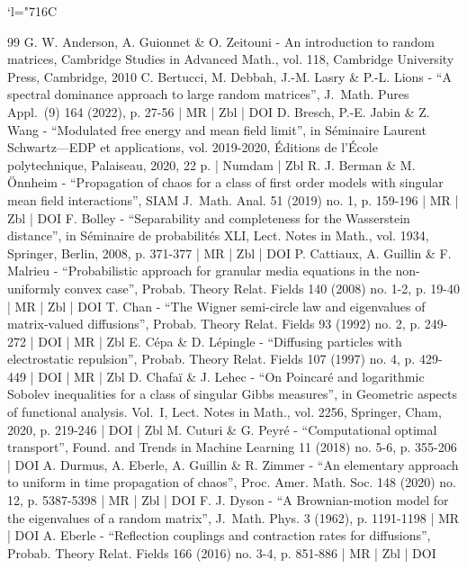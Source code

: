 \documentclass[10pt]{amsart}
\newcommand{\Changelback}{\mathcode`l="716C}
\theoremstyle{plain}
\theoremstyle{definition}
\begin{document}
\Changelback



\begin{thebibliography}{99}
G. W. Anderson, A. Guionnet \& O. Zeitouni - An introduction to random matrices, Cambridge Studies in Advanced Math., vol. 118, Cambridge University Press, Cambridge, 2010
C. Bertucci, M. Debbah, J.-M. Lasry \& P.-L. Lions - “A spectral dominance approach to large random matrices”, J. Math. Pures Appl. (9) 164 (2022), p. 27-56 | MR | Zbl | DOI
D. Bresch, P.-E. Jabin \& Z. Wang - “Modulated free energy and mean field limit”, in Séminaire Laurent Schwartz—EDP et applications, vol. 2019-2020, Éditions de l’École polytechnique, Palaiseau, 2020, 22 p. | Numdam | Zbl
R. J. Berman \& M. Önnheim - “Propagation of chaos for a class of first order models with singular mean field interactions”, SIAM J. Math. Anal. 51 (2019) no. 1, p. 159-196 | MR | Zbl | DOI
F. Bolley - “Separability and completeness for the Wasserstein distance”, in Séminaire de probabilités XLI, Lect. Notes in Math., vol. 1934, Springer, Berlin, 2008, p. 371-377 | MR | Zbl | DOI
P. Cattiaux, A. Guillin \& F. Malrieu - “Probabilistic approach for granular media equations in the non-uniformly convex case”, Probab. Theory Relat. Fields 140 (2008) no. 1-2, p. 19-40 | MR | Zbl | DOI
T. Chan - “The Wigner semi-circle law and eigenvalues of matrix-valued diffusions”, Probab. Theory Relat. Fields 93 (1992) no. 2, p. 249-272 | DOI | MR | Zbl
E. Cépa \& D. Lépingle - “Diffusing particles with electrostatic repulsion”, Probab. Theory Relat. Fields 107 (1997) no. 4, p. 429-449 | DOI | MR | Zbl
D. Chafaï \& J. Lehec - “On Poincaré and logarithmic Sobolev inequalities for a class of singular Gibbs measures”, in Geometric aspects of functional analysis. Vol. I, Lect. Notes in Math., vol. 2256, Springer, Cham, 2020, p. 219-246 | DOI | Zbl
M. Cuturi \& G. Peyré - “Computational optimal transport”, Found. and Trends in Machine Learning 11 (2018) no. 5-6, p. 355-206 | DOI
A. Durmus, A. Eberle, A. Guillin \& R. Zimmer - “An elementary approach to uniform in time propagation of chaos”, Proc. Amer. Math. Soc. 148 (2020) no. 12, p. 5387-5398 | MR | Zbl | DOI
F. J. Dyson - “A Brownian-motion model for the eigenvalues of a random matrix”, J. Math. Phys. 3 (1962), p. 1191-1198 | MR | DOI
A. Eberle - “Reflection couplings and contraction rates for diffusions”, Probab. Theory Relat. Fields 166 (2016) no. 3-4, p. 851-886 | MR | Zbl | DOI

\end{thebibliography}
\end{document}
